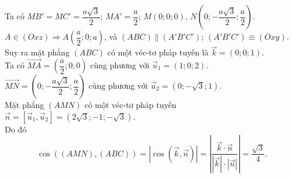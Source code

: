 \begin{bt}
{\begin{center}
		\end{center}
		Ta có $MB' = MC' =  \dfrac{a\sqrt{3}}{2}$; $MA' = \dfrac{a}{2}$;
		$M(0;0;0)$, $N\left(0; -\dfrac{a\sqrt{3}}{2};  \dfrac{a}{2}\right)$.\\
		$A \in  (Oxz) \Rightarrow A\left(\dfrac{a}{2}; 0; a\right)$, và $(ABC) \parallel (A'B'C') $; $ (A'B'C') \equiv (Oxy)$.\\
		Suy ra mặt phẳng $(ABC)$ có một véc-tơ pháp tuyến là $\overrightarrow{k} = (0;0;1)$.\\ 
		Ta  có $\overrightarrow{MA} = \left(\dfrac{a}{2}; 0; 0\right)$ cùng phương với $\overrightarrow{u}_1 = (1;0;2)$.\\
		$\overrightarrow{MN} = \left(0;  -\dfrac{a\sqrt{3}}{2}; \dfrac{a}{2}\right)$ cùng phương với $\overrightarrow{u}_2 = (0; -\sqrt{3}; 1)$.\\
		Mặt  phẳng $(AMN)$ có một véc-tơ pháp tuyến $\overrightarrow{n} = \left[\overrightarrow{u}_1, \overrightarrow{u}_2\right] = \left(2\sqrt{3}; -1; -\sqrt{3}\right)$.\\
		Do  đó
		 $$
		\cos\left((AMN),(ABC)\right) = \left|\cos\left(\overrightarrow{k},\overrightarrow{n}\right)\right| = \left|\dfrac{\overrightarrow{k} \cdot  \overrightarrow{n}}{\left|\overrightarrow{k}\right|\cdot \left|\overrightarrow{n}\right|}\right| = \dfrac{\sqrt{3}}{4}.
		$$ 
	 }
\end{bt}

